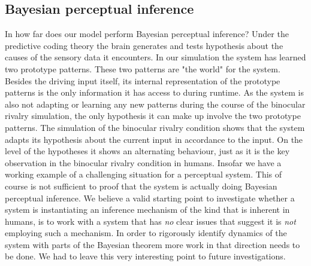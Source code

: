 \documentclass{frontiersSCNS} %
\begin{document}
    
    \subsection{Bayesian perceptual inference}
    In how far does our model perform Bayesian perceptual inference? Under the predictive coding theory the brain generates and tests hypothesis about the causes of the sensory data it encounters. In our simulation the system has learned two prototype patterns. These two patterns are "the world" for the system. Besides the driving input itself, its internal representation of the prototype patterns is the only information it has access to during runtime. As the system is also not adapting or learning any new patterns during the course of the binocular rivalry simulation, the only hypothesis it can make up involve the two prototype patterns.
    The simulation of the binocular rivalry condition shows that the system adapts its hypothesis about the current input in accordance to the input. On the level of the hypotheses it shows an alternating behaviour, just as it is the key observation in the binocular rivalry condition in humans. Insofar we have a working example of a challenging situation for a perceptual system. This of course is not sufficient to proof that the system is actually doing Bayesian perceptual inference. We believe a valid starting point to investigate whether a system is instantiating an inference mechanism of the kind that is inherent in humans, is to work with a system that has \textit{no} clear issues that suggest it is \textit{not} employing such a mechanism. In order to rigorously identify dynamics of the system with parts of the Bayesian theorem more work in that direction needs to be done. We had to leave this very interesting point to future investigations.  
    
\end{document}
